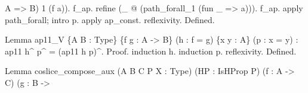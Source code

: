 \begin{coqdoccode}
\begin{coqdoccomment}
A\coqdocindent{0.50em}
=>\coqdocindent{0.50em}
B)\coqdocindent{0.50em}
1\coqdocindent{0.50em}
(f\coqdocindent{0.50em}
a)).\coqdoceol
\coqdocindent{1.00em}
f\_ap.\coqdocindent{0.50em}
refine\coqdocindent{0.50em}
(\_\coqdocindent{0.50em}
@\coqdocindent{0.50em}
(path\_forall\_1\coqdocindent{0.50em}
(fun\coqdocindent{0.50em}
\_\coqdocindent{0.50em}
=>\coqdocindent{0.50em}
a))).\coqdoceol
\coqdocindent{1.00em}
f\_ap.\coqdocindent{0.50em}
apply\coqdocindent{0.50em}
path\_forall;\coqdocindent{0.50em}
intro\coqdocindent{0.50em}
p.\coqdocindent{0.50em}
apply\coqdocindent{0.50em}
ap\_const.\coqdoceol
\coqdocindent{1.00em}
reflexivity.\coqdoceol
Defined.\coqdoceol
\end{coqdoccomment}
\coqdoceol
\coqdocemptyline
\coqdocnoindent
\begin{coqdoccomment}
\coqdoceol
Lemma\coqdocindent{0.50em}
ap11\_V\coqdocindent{0.50em}
\{A\coqdocindent{0.50em}
B\coqdocindent{0.50em}
:\coqdocindent{0.50em}
Type\}\coqdocindent{0.50em}
\{f\coqdocindent{0.50em}
g\coqdocindent{0.50em}
:\coqdocindent{0.50em}
A\coqdocindent{0.50em}
->\coqdocindent{0.50em}
B\}\coqdocindent{0.50em}
(h\coqdocindent{0.50em}
:\coqdocindent{0.50em}
f\coqdocindent{0.50em}
=\coqdocindent{0.50em}
g)\coqdocindent{0.50em}
\{x\coqdocindent{0.50em}
y\coqdocindent{0.50em}
:\coqdocindent{0.50em}
A\}\coqdocindent{0.50em}
(p\coqdocindent{0.50em}
:\coqdocindent{0.50em}
x\coqdocindent{0.50em}
=\coqdocindent{0.50em}
y)\coqdocindent{0.50em}
:\coqdoceol
\coqdocindent{1.00em}
ap11\coqdocindent{0.50em}
h\^{}\coqdocindent{0.50em}
p\^{}\coqdocindent{0.50em}
=\coqdocindent{0.50em}
(ap11\coqdocindent{0.50em}
h\coqdocindent{0.50em}
p)\^{}.\coqdoceol
Proof.\coqdoceol
\coqdocindent{1.00em}
induction\coqdocindent{0.50em}
h.\coqdocindent{0.50em}
induction\coqdocindent{0.50em}
p.\coqdocindent{0.50em}
reflexivity.\coqdoceol
Defined.\coqdoceol
\end{coqdoccomment}
\coqdoceol
\coqdocemptyline
\coqdocnoindent
\begin{coqdoccomment}
\coqdoceol
Lemma\coqdocindent{0.50em}
coslice\_compose\_aux\coqdocindent{0.50em}
(A\coqdocindent{0.50em}
B\coqdocindent{0.50em}
C\coqdocindent{0.50em}
P\coqdocindent{0.50em}
X\coqdocindent{0.50em}
:\coqdocindent{0.50em}
Type)\coqdocindent{0.50em}
(HP\coqdocindent{0.50em}
:\coqdocindent{0.50em}
IsHProp\coqdocindent{0.50em}
P)\coqdocindent{0.50em}
\coqdoceol
\coqdocindent{3.00em}
(f\coqdocindent{0.50em}
:\coqdocindent{0.50em}
A\coqdocindent{0.50em}
->\coqdocindent{0.50em}
C)\coqdocindent{0.50em}
(g\coqdocindent{0.50em}
:\coqdocindent{0.50em}
B\coqdocindent{0.50em}
->\coqdocindent{0.50em}

\end{coqdoccomment}
\end{coqdoccode}
